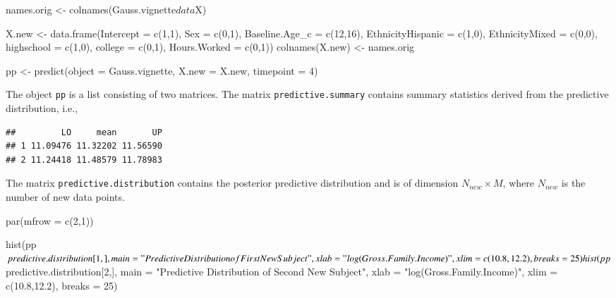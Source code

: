 \documentclass[a4paper, preprint, 3p,
authoryear]{elsarticle} %
\newenvironment{Shaded}{\begin{snugshade}}{\end{snugshade}}
\newcommand{\NormalTok}[1]{#1}
\begin{document}
\begin{Shaded}
\begin{Highlighting}[]
\NormalTok{names.orig \textless{}{-} colnames(Gauss.vignette$data$X)}

\NormalTok{X.new \textless{}{-} data.frame(Intercept = c(1,1),}
\NormalTok{                    Sex = c(0,1),}
\NormalTok{                    Baseline.Age\_c = c(12,16),}
\NormalTok{                    EthnicityHispanic = c(1,0),}
\NormalTok{                    EthnicityMixed = c(0,0),}
\NormalTok{                    highschool = c(1,0),}
\NormalTok{                    college = c(0,1),}
\NormalTok{                    Hours.Worked = c(0,1))}
\NormalTok{colnames(X.new) \textless{}{-} names.orig}

\NormalTok{pp \textless{}{-} predict(object = Gauss.vignette,}
\NormalTok{              X.new = X.new,}
\NormalTok{              timepoint = 4)}
\end{Highlighting}
\end{Shaded}

The object \texttt{pp} is a list consisting of two matrices. The matrix
\texttt{predictive.summary} contains summary statistics derived from the
predictive distribution, i.e.,

\begin{Shaded}
\end{Shaded}

\begin{verbatim}
##         LO     mean       UP
## 1 11.09476 11.32202 11.56590
## 2 11.24418 11.48579 11.78983
\end{verbatim}

The matrix \texttt{predictive.distribution} contains the posterior
predictive distribution and is of dimension \(N_{new} \times M\), where
\(N_{new}\) is the number of new data points.

\begin{Shaded}
\begin{Highlighting}[]
\NormalTok{par(mfrow = c(2,1))}

\NormalTok{hist(pp$predictive.distribution[1,], }
\NormalTok{     main = "Predictive Distribution of First New Subject",}
\NormalTok{     xlab = "log(Gross.Family.Income)",}
\NormalTok{     xlim = c(10.8,12.2),}
\NormalTok{     breaks = 25)}

\NormalTok{hist(pp$predictive.distribution[2,], }
\NormalTok{     main = "Predictive Distribution of Second New Subject",}
\NormalTok{     xlab = "log(Gross.Family.Income)",}
\NormalTok{     xlim = c(10.8,12.2),}
\NormalTok{     breaks = 25)}
\end{Highlighting}
\end{Shaded}
\end{document}
